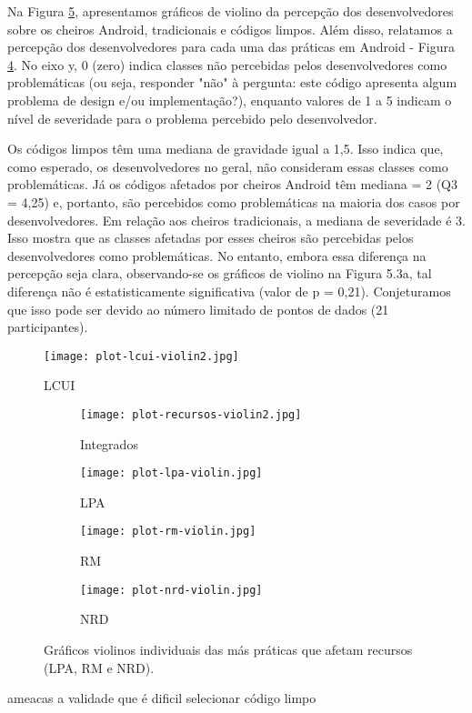 Na Figura \ref{fig:all-violin}, apresentamos gráficos de violino da percepção dos desenvolvedores sobre os cheiros Android, tradicionais e códigos limpos. Além disso, relatamos a percepção dos desenvolvedores para cada uma das práticas em Android - Figura \ref{fig:smelly-violin}. No eixo y, 0 (zero) indica classes não percebidas pelos desenvolvedores como problemáticas (ou seja, responder "não" à pergunta: este código apresenta algum problema de design e/ou implementação?), enquanto valores de 1 a 5 indicam o nível de severidade para o problema percebido pelo desenvolvedor.

Os códigos limpos têm uma mediana de gravidade igual a 1,5. Isso indica que, como esperado, os desenvolvedores no geral, não consideram essas classes como problemáticas. Já os códigos afetados por cheiros Android têm mediana = 2 (Q3 = 4,25) e, portanto, são percebidos como problemáticas na maioria dos casos por desenvolvedores. Em relação aos cheiros tradicionais, a mediana de severidade é 3. Isso mostra que as classes afetadas por esses cheiros são percebidas pelos desenvolvedores como problemáticas. No entanto, embora essa diferença na percepção seja clara, observando-se os gráficos de violino na Figura 5.3a, tal diferença não é estatisticamente significativa (valor de p = 0,21). Conjeturamos que isso pode ser devido ao número limitado de pontos de dados (21 participantes).

\begin{figure}[!htb]
	\centering
	\texttt{[image: plot-lcui-violin2.jpg]}
	\caption{LCUI}
	\label{fig:CategoriaXRecorrencia}
\end{figure}

\begin{figure*}
\centering
\begin{subfigure}{.23\textwidth}
  \centering
  \texttt{[image: plot-recursos-violin2.jpg]}
  \caption{Integrados}
  \label{fig:smelly-violin}
\end{subfigure}%
\begin{subfigure}{.23\textwidth}
  \centering
  \texttt{[image: plot-lpa-violin.jpg]}
  \caption{LPA}
  \label{fig:all-violin}
\end{subfigure}%
\begin{subfigure}{.23\textwidth}
  \centering
  \texttt{[image: plot-rm-violin.jpg]}
  \caption{RM}
  \label{fig:smelly-violin}
\end{subfigure}
\begin{subfigure}{.23\textwidth}
  \centering
  \texttt{[image: plot-nrd-violin.jpg]}
  \caption{NRD}
  \label{fig:all-violin}
\end{subfigure}%
\caption{Gráficos violinos individuais das más práticas que afetam recursos (LPA, RM e NRD).}
\label{fig:test}
\end{figure*}



ameacas a validade que é dificil selecionar código limpo